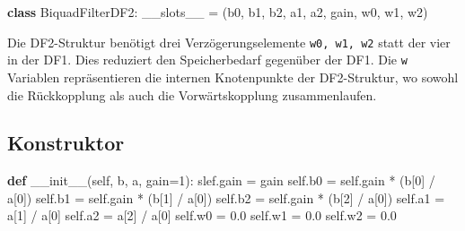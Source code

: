 \documentclass[
  ngerman,
  letterpaper,
  DIV=11]{scrreprt}
\newenvironment{Shaded}{\begin{snugshade}}{\end{snugshade}}
\newcommand{\DecValTok}[1]{\textcolor[rgb]{0.68,0.00,0.00}{#1}}
\newcommand{\FloatTok}[1]{\textcolor[rgb]{0.68,0.00,0.00}{#1}}
\newcommand{\FunctionTok}[1]{\textcolor[rgb]{0.28,0.35,0.67}{#1}}
\newcommand{\KeywordTok}[1]{\textcolor[rgb]{0.00,0.23,0.31}{\textbf{#1}}}
\newcommand{\NormalTok}[1]{\textcolor[rgb]{0.00,0.23,0.31}{#1}}
\newcommand{\OperatorTok}[1]{\textcolor[rgb]{0.37,0.37,0.37}{#1}}
\newcommand{\StringTok}[1]{\textcolor[rgb]{0.13,0.47,0.30}{#1}}
\newcommand{\VariableTok}[1]{\textcolor[rgb]{0.07,0.07,0.07}{#1}}
\begin{document}
\begin{Shaded}
\begin{Highlighting}[]
\KeywordTok{class}\NormalTok{ BiquadFilterDF2:}
    \VariableTok{\_\_slots\_\_} \OperatorTok{=}\NormalTok{ (}\StringTok{\textquotesingle{}b0\textquotesingle{}}\NormalTok{, }\StringTok{\textquotesingle{}b1\textquotesingle{}}\NormalTok{, }\StringTok{\textquotesingle{}b2\textquotesingle{}}\NormalTok{, }\StringTok{\textquotesingle{}a1\textquotesingle{}}\NormalTok{, }\StringTok{\textquotesingle{}a2\textquotesingle{}}\NormalTok{, }\StringTok{\textquotesingle{}gain\textquotesingle{}}\NormalTok{, }\StringTok{\textquotesingle{}w0\textquotesingle{}}\NormalTok{, }\StringTok{\textquotesingle{}w1\textquotesingle{}}\NormalTok{, }\StringTok{\textquotesingle{}w2\textquotesingle{}}\NormalTok{)}
\end{Highlighting}
\end{Shaded}

Die DF2-Struktur benötigt drei Verzögerungselemente
\texttt{w0,\ w1,\ w2} statt der vier in der DF1. Dies reduziert den
Speicherbedarf gegenüber der DF1. Die \texttt{w} Variablen
repräsentieren die internen Knotenpunkte der DF2-Struktur, wo sowohl die
Rückkopplung als auch die Vorwärtskopplung zusammenlaufen.

\subsection{Konstruktor}\label{konstruktor-4}

\begin{Shaded}
\begin{Highlighting}[]
    \KeywordTok{def} \FunctionTok{\_\_init\_\_}\NormalTok{(}\VariableTok{self}\NormalTok{, b, a, gain}\OperatorTok{=}\DecValTok{1}\NormalTok{):}
\NormalTok{        slef.gain }\OperatorTok{=}\NormalTok{ gain}
        \VariableTok{self}\NormalTok{.b0 }\OperatorTok{=} \VariableTok{self}\NormalTok{.gain }\OperatorTok{*}\NormalTok{ (b[}\DecValTok{0}\NormalTok{] }\OperatorTok{/}\NormalTok{ a[}\DecValTok{0}\NormalTok{])}
        \VariableTok{self}\NormalTok{.b1 }\OperatorTok{=} \VariableTok{self}\NormalTok{.gain }\OperatorTok{*}\NormalTok{ (b[}\DecValTok{1}\NormalTok{] }\OperatorTok{/}\NormalTok{ a[}\DecValTok{0}\NormalTok{])}
        \VariableTok{self}\NormalTok{.b2 }\OperatorTok{=} \VariableTok{self}\NormalTok{.gain }\OperatorTok{*}\NormalTok{ (b[}\DecValTok{2}\NormalTok{] }\OperatorTok{/}\NormalTok{ a[}\DecValTok{0}\NormalTok{])}
        \VariableTok{self}\NormalTok{.a1 }\OperatorTok{=}\NormalTok{ a[}\DecValTok{1}\NormalTok{] }\OperatorTok{/}\NormalTok{ a[}\DecValTok{0}\NormalTok{]}
        \VariableTok{self}\NormalTok{.a2 }\OperatorTok{=}\NormalTok{ a[}\DecValTok{2}\NormalTok{] }\OperatorTok{/}\NormalTok{ a[}\DecValTok{0}\NormalTok{]}
        \VariableTok{self}\NormalTok{.w0 }\OperatorTok{=} \FloatTok{0.0}
        \VariableTok{self}\NormalTok{.w1 }\OperatorTok{=} \FloatTok{0.0}
        \VariableTok{self}\NormalTok{.w2 }\OperatorTok{=} \FloatTok{0.0}
\end{Highlighting}
\end{Shaded}
\end{document}
